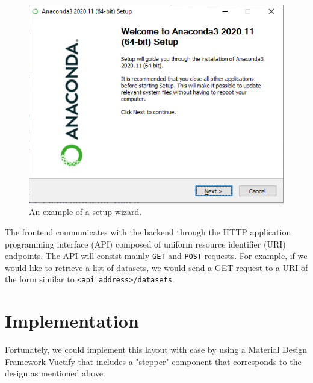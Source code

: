 \begin{figure}[h]
    \centering
    \includegraphics[width=0.65\linewidth]{Sources/Figures/anaconda.png}
    \caption{An example of a setup wizard.}
    \label{fig:wizard}
\end{figure}

The frontend communicates with the backend through the HTTP application
programming interface (API) composed of uniform resource identifier (URI)
endpoints. The API will consist mainly \texttt{GET} and \texttt{POST} requests.
For example, if we would like to retrieve a list of datasets, we would send a
GET request to a URI of the form similar to \texttt{<api\_address>/datasets}.

\section{Implementation}
Fortunately, we could implement this layout with ease by using a Material Design
Framework Vuetify that includes a "stepper" component that corresponds to the
design as mentioned above.